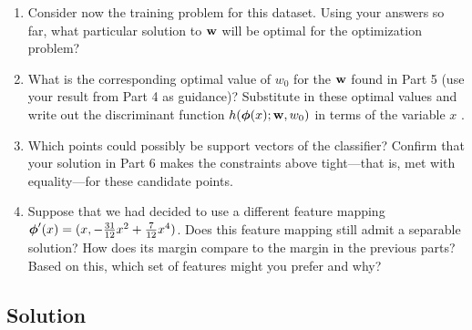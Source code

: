 \documentclass[submit]{harvardml}
\begin{document}
\begin{problem}
\begin{enumerate}
\item Consider now the training problem for this dataset. Using your
  answers so far, what particular solution to $\mathbf{w}$ will be optimal
  for the optimization problem?

\item What is the corresponding optimal value of $w_0$ for the
  $\mathbf{w}$ found in Part 5 (use your result from Part 4 as guidance)?
  Substitute in these optimal values and write out the discriminant
  function $h(\boldsymbol{\phi}(x);\mathbf{w},w_0)$ in terms of the variable $x$ .


\item Which points could possibly be support vectors of the classifier?  Confirm that
  your solution in Part 6 makes the constraints above tight---that is,
  met with equality---for these candidate points.

\item Suppose that we had decided to use a different feature mapping
    $\boldsymbol{\phi}'(x) = (x, -\frac{31}{12}x^2 + \frac{7}{12}x^4 )$.  Does
    this feature mapping still admit a separable solution?  How does
    its margin compare to the margin in the previous parts?  Based on
    this, which set of features might you prefer and why? 
    
\end{enumerate}

\end{problem}

\subsection*{Solution}
\end{document}

